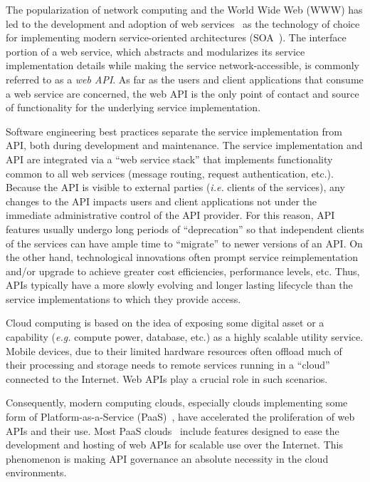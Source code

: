 The popularization of network computing and the World Wide Web (WWW) 
has led to the development and adoption of web services~\cite{6094008} as
the technology of choice for implementing modern service-oriented 
architectures (SOA~\cite{Haines:2010:SAM:1787234.1787269}).
The interface portion of a web service, which abstracts and modularizes
its service implementation
details while making the service network-accessible, is commonly referred to
as a {\em web API}. As far as the users and client applications that consume a 
web service
are concerned, the web API is the only point of contact and source of
functionality for the underlying service implementation.

Software engineering best practices separate the service implementation
from API, both during development and maintenance.
The service implementation and API are integrated via 
a ``web service stack'' that implements functionality common to all web
services (message routing, request authentication, etc.).
Because the API is visible to external parties ({\em i.e.} clients of the
services), any changes to the API
impacts users and client applications not under the immediate administrative control
of the API provider.  For this reason, API features 
usually undergo long
periods of ``deprecation'' so that independent clients of the services can have
ample time to ``migrate'' to newer versions of an API.  On the other hand,
technological innovations often prompt service reimplementation and/or 
upgrade to
achieve greater cost efficiencies, performance levels, etc.
Thus, APIs typically have a more
slowly evolving and longer lasting lifecycle than the service
implementations to which they provide access. 

Cloud computing is based on the idea of exposing some digital asset or a
capability ({\em e.g.} compute power, database, etc.) 
as a highly scalable utility service.  Mobile
devices, due to their limited hardware resources often offload much of their
processing and storage needs to remote services running in a ``cloud''
connected to the Internet.  Web APIs
play a crucial role in such scenarios. 

Consequently, modern computing clouds, especially clouds implementing some form
of Platform-as-a-Service (PaaS)~\cite{4548165}, have accelerated the
proliferation of web APIs and their use.  Most PaaS
clouds~\cite{appscale13,cloudfoundry,openshift} include
features designed to
ease the development and hosting of web APIs for scalable use over the Internet. 
This phenomenon is making API governance an absolute necessity in the cloud
environments.

